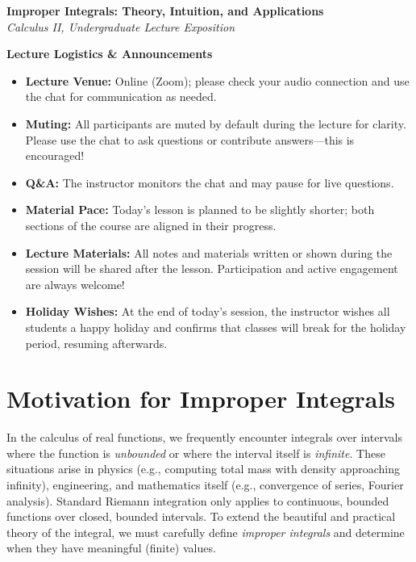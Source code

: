 \documentclass[12pt]{article}
\theoremstyle{definition}
\begin{document}
\begin{center}
    {\LARGE\bfseries Improper Integrals: Theory, Intuition, and Applications} \\
    \vspace{0.2cm}
    {\large\it Calculus II, Undergraduate Lecture Exposition}
\end{center}

\vspace{0.5cm}

\begin{administrative_note}
\textbf{Lecture Logistics \& Announcements}

\begin{itemize}[leftmargin=2em]
    \item \textbf{Lecture Venue:} Online (Zoom); please check your audio connection and use the chat for communication as needed.
    \item \textbf{Muting:} All participants are muted by default during the lecture for clarity. Please use the chat to ask questions or contribute answers---this is encouraged!
    \item \textbf{Q\&A:} The instructor monitors the chat and may pause for live questions.
    \item \textbf{Material Pace:} Today's lesson is planned to be slightly shorter; both sections of the course are aligned in their progress.
    \item \textbf{Lecture Materials:} All notes and materials written or shown during the session will be shared after the lesson. Participation and active engagement are always welcome!
    \item \textbf{Holiday Wishes:} At the end of today's session, the instructor wishes all students a happy holiday and confirms that classes will break for the holiday period, resuming afterwards.
\end{itemize}
\end{administrative_note}

\vspace{0.6cm}

\tableofcontents

\vspace{0.5cm}

\section{Motivation for Improper Integrals}

In the calculus of real functions, we frequently encounter integrals over intervals where the function is {\it unbounded} or where the interval itself is {\it infinite}. These situations arise in physics (e.g., computing total mass with density approaching infinity), engineering, and mathematics itself (e.g., convergence of series, Fourier analysis). Standard Riemann integration only applies to continuous, bounded functions over closed, bounded intervals. To extend the beautiful and practical theory of the integral, we must carefully define \emph{improper integrals} and determine when they have meaningful (finite) values.
\end{document}

